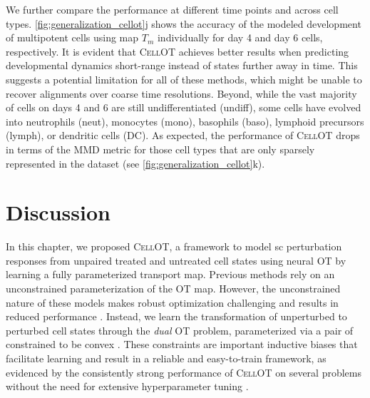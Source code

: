 We further compare the performance at different time points and across cell types.
\cref{fig:generalization_cellot}j shows the accuracy of the modeled development of multipotent cells using map $T_m$ individually for day 4 and day 6 cells, respectively. It is evident that \textsc{CellOT} achieves better results when predicting developmental dynamics short-range instead of states further away in time.
This suggests a potential limitation for all of these methods, which might be unable to recover alignments over coarse time resolutions.
Beyond, while the vast majority of cells on days 4 and 6 are still undifferentiated (undiff), some cells have evolved into neutrophils (neut), monocytes (mono), basophils (baso), lymphoid precursors (lymph), or dendritic cells (DC).
As expected, the performance of \textsc{CellOT} drops in terms of the \acrshort{MMD} metric for those cell types that are only sparsely represented in the dataset (see \cref{fig:generalization_cellot}k).

\section{Discussion}

In this chapter, we proposed \textsc{CellOT}, a framework to model \acrlong{sc} perturbation responses from unpaired treated and untreated cell states using neural \acrlong{OT} by learning a fully parameterized transport map.
Previous methods \citep{rout2021generative, yang2018scalable, prasad2020optimal} rely on an unconstrained parameterization of the \acrlong{OT} map. However, the unconstrained nature of these models makes robust optimization challenging and results in reduced performance \citep[Table 1]{makkuva2020optimal}.
Instead, we learn the transformation of unperturbed to perturbed cell states through the \emph{dual} \acrlong{OT} problem, parameterized via a pair of  constrained to be convex \citep{makkuva2020optimal}.
These constraints are important inductive biases that facilitate learning and result in a reliable and easy-to-train framework, as evidenced by the consistently strong performance of \textsc{CellOT} on several problems without the need for extensive hyperparameter tuning \citep[Online Methods]{bunne2021learning}. \\


